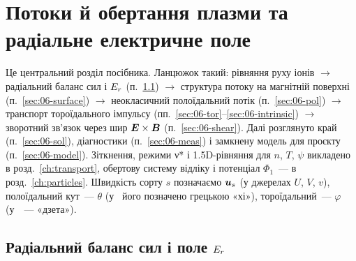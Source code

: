 \chapter{Потоки й обертання плазми та радіальне електричне поле}\label{ch:flows}

Це центральний розділ посібника. Ланцюжок такий: рівняння руху іонів $\to$ радіальний баланс сил і $E_{r}$ (п.~\ref{sec:06-force}) $\to$ структура потоку на магнітній поверхні (п.~\ref{sec:06-surface}) $\to$ неокласичний полоїдальний потік (п.~\ref{sec:06-pol}) $\to$ транспорт тороїдального імпульсу (пп.~\ref{sec:06-tor}--\ref{sec:06-intrinsic}) $\to$ зворотний зв'язок через шир $\bm{E}\times\bm{B}$ (п.~\ref{sec:06-shear}). Далі розглянуто край (п.~\ref{sec:06-sol}), діагностики (п.~\ref{sec:06-meas}) і замкнену модель для проєкту (п.~\ref{sec:06-model}). Зіткнення, режими ν* і 1.5D-рівняння для $n$, $T$, $\psi$ викладено в розд.~\ref{ch:transport}, обертову систему відліку і потенціал $\Phi_1$~--- в розд.~\ref{ch:particles}. Швидкість сорту $s$ позначаємо $\bm{u}_s$ (у джерелах $U$, $V$, $v$), полоїдальний кут~--- $\theta$ (у~\cite{Singh2004,Seto2014} його позначено грецькою «хі»), тороїдальний~--- $\varphi$ (у~\cite{Seto2014}~--- «дзета»).

\section{Радіальний баланс сил і поле $E_{r}$}\label{sec:06-force}


